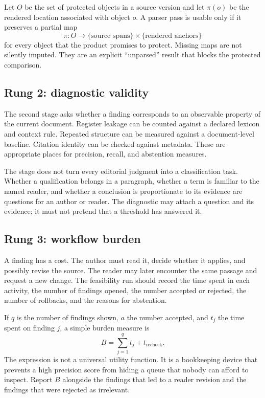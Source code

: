 Let $O$ be the set of protected objects in a source version and let
$\pi(o)$ be the rendered location associated with object $o$. A parser pass is
usable only if it preserves a partial map
\[
  \pi: O \longrightarrow \{\text{source spans}\}\times
  \{\text{rendered anchors}\}
\]
for every object that the product promises to protect. Missing maps are not
silently imputed. They are an explicit ``unparsed'' result that blocks the
protected comparison.

\subsection{Rung 2: diagnostic validity}

The second stage asks whether a finding corresponds to an observable property
of the current document. Register leakage can be counted against a declared
lexicon and context rule. Repeated structure can be measured against a
document-level baseline. Citation identity can be checked against metadata.
These are appropriate places for precision, recall, and abstention measures.

The stage does not turn every editorial judgment into a classification task.
Whether a qualification belongs in a paragraph, whether a term is familiar to
the named reader, and whether a conclusion is proportionate to its evidence
are questions for an author or reader. The diagnostic may attach a question
and its evidence; it must not pretend that a threshold has answered it.

\subsection{Rung 3: workflow burden}

A finding has a cost. The author must read it, decide whether it applies, and
possibly revise the source. The reader may later encounter the same passage
and request a new change. The feasibility run should record the time spent in
each activity, the number of findings opened, the number accepted or rejected,
the number of rollbacks, and the reasons for abstention.

If $q$ is the number of findings shown, $a$ the number accepted, and $t_j$ the
time spent on finding $j$, a simple burden measure is
\[
  B=\sum_{j=1}^{q}t_j + t_{\mathrm{recheck}}.
\]
The expression is not a universal utility function. It is a bookkeeping
device that prevents a high precision score from hiding a queue that nobody
can afford to inspect. Report $B$ alongside the findings that led to a reader
revision and the findings that were rejected as irrelevant.

